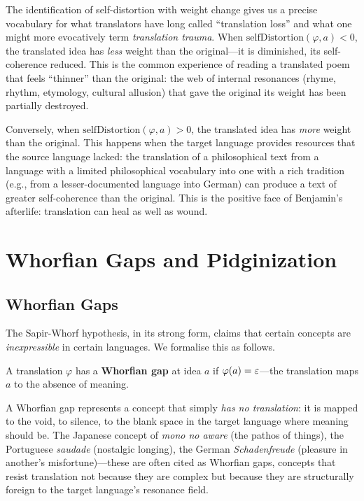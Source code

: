\begin{interpretation}
\label{interp:self-distortion-trauma}
The identification of self-distortion with weight change gives us a precise vocabulary for what translators have long called ``translation loss'' and what one might more evocatively term \emph{translation trauma}.  When $\mathrm{selfDistortion}(\varphi, a) < 0$, the translated idea has \emph{less} weight than the original---it is diminished, its self-coherence reduced.  This is the common experience of reading a translated poem that feels ``thinner'' than the original: the web of internal resonances (rhyme, rhythm, etymology, cultural allusion) that gave the original its weight has been partially destroyed.

Conversely, when $\mathrm{selfDistortion}(\varphi, a) > 0$, the translated idea has \emph{more} weight than the original.  This happens when the target language provides resources that the source language lacked: the translation of a philosophical text from a language with a limited philosophical vocabulary into one with a rich tradition (e.g., from a lesser-documented language into German) can produce a text of greater self-coherence than the original.  This is the positive face of Benjamin's afterlife: translation can heal as well as wound.
\end{interpretation}

\section{Whorfian Gaps and Pidginization}
\label{sec:untranslatable:whorfian}

\subsection{Whorfian Gaps}

The Sapir-Whorf hypothesis, in its strong form, claims that certain concepts
are \emph{inexpressible} in certain languages.  We formalise this as follows.

\begin{definition}
\label{def:whorfian-gap}
A translation $\varphi$ has a \textbf{Whorfian gap} at idea $a$ if
$\varphi(a) = \varepsilon$---the translation maps $a$ to the absence of meaning.
\end{definition}

A Whorfian gap represents a concept that simply \emph{has no translation}:
it is mapped to the void, to silence, to the blank space in the target
language where meaning should be.  The Japanese concept of \emph{mono no
aware} (the pathos of things), the Portuguese \emph{saudade} (nostalgic
longing), the German \emph{Schadenfreude} (pleasure in another's
misfortune)---these are often cited as Whorfian gaps, concepts that resist
translation not because they are complex but because they are structurally
foreign to the target language's resonance field.

